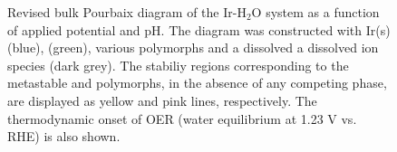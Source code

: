 \begin{figure}[!htb]
\centering
{}
\caption{\label{fig:bulk_pourbaix}
%
Revised bulk Pourbaix diagram of the Ir-H$_2$O system as a function of applied potential and pH.
%
The diagram was constructed with Ir(s) (blue), \rIrOtwo (green), various \IrOthree polymorphs and a dissolved
a dissolved  ion species (dark grey).
%
The stabiliy regions corresponding to the metastable \rIrOthree and \bIrOthree polymorphs, in the absence of any competing \IrOthree phase, are displayed as yellow and pink lines, respectively. 
%
The thermodynamic onset of OER (water equilibrium at 1.23 V vs. RHE) is also shown.
%
%
}
\end{figure}


